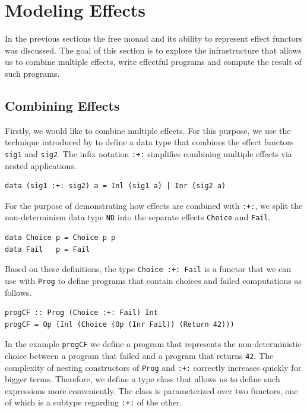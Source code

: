 \documentclass[a4paper, 11pt, fleqn, twoside, abstract=on]{scrreprt}
\newcommand{\hinl}[1]{\texttt{#1}}
\newcommand{\cinl}[1]{\texttt{#1}}
\begin{document}
\section{Modeling Effects}
In the previous sections the free monad and its ability to represent effect functors was discussed.
The goal of this section is to explore the infrastructure that allows us to combine multiple effects, write effectful programs and compute the result of such programs.

\subsection{Combining Effects}
Firstly, we would like to combine multiple effects.
For this purpose, we use the technique introduced by \citet{swierstra2008} to define a data type that combines the effect functors \hinl{sig1} and \hinl{sig2}.
The infix notation \hinl{:+:} simplifies combining multiple effects via nested applications.

\begin{verbatim}
data (sig1 :+: sig2) a = Inl (sig1 a) | Inr (sig2 a)
\end{verbatim}

For the purpose of demonstrating how effects are combined with \cinl{:+:}, we split the non-determinism data type \hinl{ND} into the separate effects \hinl{Choice} and \hinl{Fail}.

\begin{verbatim}
data Choice p = Choice p p
data Fail   p = Fail
\end{verbatim}

Based on these definitions, the type \hinl{Choice :+: Fail} is a functor that we can use with \hinl{Prog} to define programs that contain choices and failed computations as follows.

\begin{verbatim}
progCF :: Prog (Choice :+: Fail) Int
progCF = Op (Inl (Choice (Op (Inr Fail)) (Return 42)))
\end{verbatim}

In the example \hinl{progCF} we define a program that represents the non-deterministic choice between a program that failed and a program that returns \hinl{42}.
The complexity of nesting constructors of \hinl{Prog} and \hinl{:+:} correctly increases quickly for bigger terms.
Therefore, we define a type class that allows us to define such expressions more conveniently.
The class is parameterized over two functors, one of which is a subtype regarding \hinl{:+:} of the other.
\end{document}
